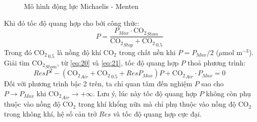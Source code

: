 \documentclass[a4paper]{article}
\begin{document}
\begin{figure}
    \centering
    \caption{Mô hình động lực Michaelis - Menten}
    \label{fig:michaelis-menten}
\end{figure}
Khi đó tốc độ quang hợp cho bởi công thức:
\begin{equation}\label{eq:21}
    P = \frac{P_{Max} \cdot \mathrm{CO_2}_{Stom}}{\mathrm{CO_2}_{Stop} + \mathrm{CO_2}_{\,0.5}}
\end{equation}
Trong đó $\mathrm{CO_2}_{\,0.5}$ là nồng độ khí $\mathrm{CO_2}$ trong chất nền khi $P = P_{Max}/2$ ($\mu$mol m$^{-3}$). Giải tìm $\mathrm{CO_2}_{Stom}$, từ \eqref{eq:20} và \eqref{eq:21}, tốc độ quang hợp $P$ thoả phương trình:
\begin{equation}\label{eq:22}
    ResP^2 - (\mathrm{CO_2}_{Air} + \mathrm{CO_2}_{\,0.5} + ResP_{Max})P + \mathrm{CO_2}_{Air}\cdot P_{Max} = 0
\end{equation}
Đối với phương trình bậc 2 trên, ta chỉ quan tâm đến nghiệm $P$ sao cho $P \rightarrow P_{Max}$ khi $\mathrm{CO_2}_{Air} \rightarrow +\infty$. Lưu ý, lúc này tốc độ quang hợp $P$ không còn phụ thuộc vào nồng độ $\mathrm{CO_2}$ trong khí khổng nữa mà chỉ phụ thuộc vào nồng độ $\mathrm{CO_2}$ trong không khí, hệ số cản trở $Res$ và tốc độ quang hợp cực đại.
\end{document}
